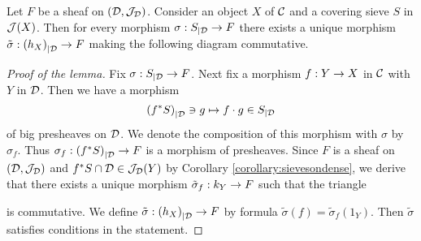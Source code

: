 \begin{lemma}\label{lemma:extensionofmorphismsforsheavesinsubcategory}
Let $F$ be a sheaf on $({\mathcal D},{\mathcal J}_{{\mathcal D}})$. Consider an object $X$ of ${\mathcal C}$ and a covering sieve $S$ in ${\mathcal J}(X)$. Then for every morphism $\sigma:S_{\mid {\mathcal D}}\rightarrow F$ there exists a unique morphism $\tilde{\sigma}:\left(h_X\right)_{\mid {\mathcal D}}\rightarrow F$ making the following diagram commutative.
\begin{center}
\end{center}
\end{lemma}
\begin{proof}[Proof of the lemma]
Fix $\sigma:S_{\mid {\mathcal D}}\rightarrow F$. Next fix a morphism $f:Y\rightarrow X$ in ${\mathcal C}$ with $Y$ in ${\mathcal D}$. Then we have a morphism
$$\left(f^*S\right)_{\mid {\mathcal D}}\ni g\mapsto f\cdot g\in S_{\mid {\mathcal D}}$$
of big presheaves on ${\mathcal D}$. We denote the composition of this morphism with $\sigma$ by $\sigma_f$. Thus $\sigma_f:\left(f^*S\right)_{\mid {\mathcal D}}\rightarrow F$ is a morphism of presheaves. Since $F$ is a sheaf on $({\mathcal D},{\mathcal J}_{{\mathcal D}})$ and $f^*S\cap {\mathcal D}\in {\mathcal J}_{{\mathcal D}}(Y)$ by Corollary \ref{corollary:sievesondense}, we derive that there exists a unique morphism $\tilde{\sigma}_f:k_{Y}\rightarrow F$ such that
the triangle
\begin{center}
\end{center}
is commutative. We define $\tilde{\sigma}:\left(h_X\right)_{\mid {\mathcal D}}\rightarrow F$ by formula $\tilde{\sigma}(f) = \tilde{\sigma}_f(1_Y)$. Then $\tilde{\sigma}$ satisfies conditions in the statement.
\end{proof}
